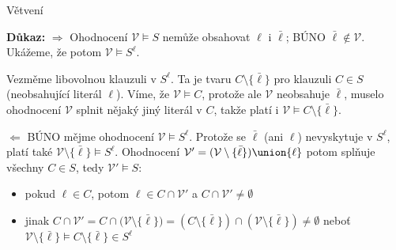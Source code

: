 \documentclass{beamer}
\begin{document}
\begin{frame}{Větvení}
    
    \pause

    \textbf{Důkaz:} \alert{$\Rightarrow$} Ohodnocení $\mathcal V\models S$ nemůže obsahovat $\ell$ i $\bar\ell$; BÚNO \alert{$\bar\ell\notin\mathcal V$}. \pause Ukážeme, že potom $\mathcal V\models S^\ell$. \pause
    
    Vezměme libovolnou klauzuli v $S^\ell$. Ta je tvaru $C\setminus\{\bar\ell\}$ pro klauzuli $C\in S$ (neobsahující literál $\ell$).
     \pause Víme, že $\mathcal V\models C$, protože ale $\mathcal V$ neobsahuje $\bar\ell$, muselo ohodnocení $\mathcal V$ splnit nějaký jiný literál v $C$, takže platí i $\mathcal V\models C\setminus\{\bar\ell\}$.\pause

    \alert{$\Leftarrow$} BÚNO mějme ohodnocení \alert{$\mathcal V\models S^\ell$}. \pause Protože se $\bar\ell$ (ani $\ell$) nevyskytuje v $S^\ell$, platí také \alert{$\mathcal V\setminus\{\bar\ell\}\models S^\ell$}. \pause Ohodnocení \alert{$\mathcal V'=(\mathcal V\setminus\{\bar\ell\})\union\{\ell\}$} potom splňuje všechny $C\in S$, tedy $\mathcal V'\models S$: \pause
    \begin{itemize}
        \item pokud $\ell\in C$, potom $\ell\in C\cap\mathcal V'$ a $C\cap\mathcal V'\neq\emptyset$\pause
        \item jinak $C\cap\mathcal V'=C\cap\mathcal (\mathcal V\setminus\{\bar\ell\})=(C\setminus\{\bar\ell\})\cap(\mathcal V\setminus\{\bar\ell\})\neq\emptyset$ \pause neboť $\mathcal V\setminus\{\bar\ell\}\models C\setminus\{\bar\ell\}\in S^\ell$\hfill\qedsymbol
    \end{itemize}

\end{frame}
\end{document}
